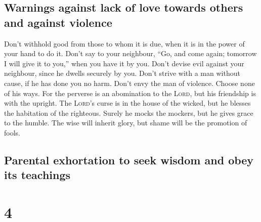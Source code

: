 \hypertarget{warnings-against-lack-of-love-towards-others-and-against-violence}{%
\subsection{Warnings against lack of love towards others and against
violence}\label{warnings-against-lack-of-love-towards-others-and-against-violence}}

 Don't withhold good from those to whom it is due, when
it is in the power of your hand to do it.  Don't say to
your neighbour, ``Go, and come again; tomorrow I will give it to you,''
when you have it by you.  Don't devise evil against your
neighbour, since he dwells securely by you.  Don't strive
with a man without cause, if he has done you no harm. 
Don't envy the man of violence. Choose none of his ways. 
For the perverse is an abomination to the \textsc{Lord}, but his
friendship is with the upright.  The \textsc{Lord}'s
curse is in the house of the wicked, but he blesses the habitation of
the righteous.  Surely he mocks the mockers, but he gives
grace to the humble.  The wise will inherit glory, but
shame will be the promotion of fools.

\hypertarget{parental-exhortation-to-seek-wisdom-and-obey-its-teachings}{%
\subsection{Parental exhortation to seek wisdom and obey its
teachings}\label{parental-exhortation-to-seek-wisdom-and-obey-its-teachings}}

\hypertarget{section-3}{%
\section{4}\label{section-3}}

